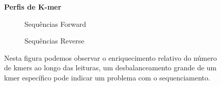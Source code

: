 {\begin{landscape}
\begin{figure}
\centering
\Large\textbf{Perfis de K-mer}\par\medskip
\begin{subfigure}{.7\textwidth}
  \centering
  \caption{Sequências Forward}
\end{subfigure}%
\begin{subfigure}{.7\textwidth}
  \centering
  \caption{Sequências Reverse}
\end{subfigure}
\caption[Perfis de K-mer]{Nesta figura podemos observar o enriquecimento relativo do número de kmers ao longo das leituras, um desbalanceamento grande de um kmer específico pode indicar um problema com o sequenciamento.}
\label{fig:kmer_profiles}
\end{figure}

\end{landscape}

}

